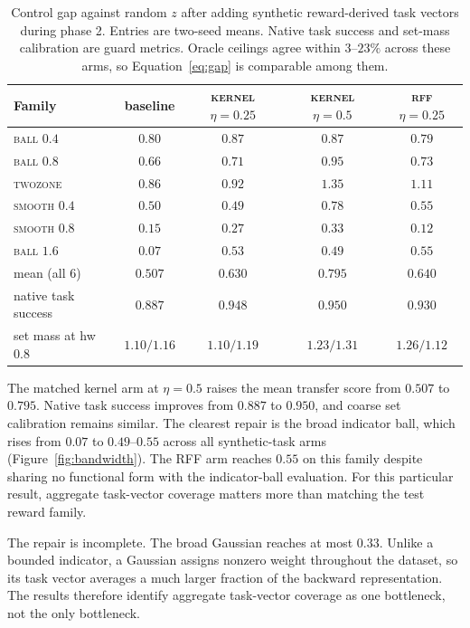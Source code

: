 \documentclass{article}
\begin{document}
\begin{table}[t]
\centering\small
\begin{tabular}{l c c c c}
\toprule
Family & baseline & \textsc{kernel} $\eta{=}0.25$ & \textsc{kernel} $\eta{=}0.5$ & \textsc{rff} $\eta{=}0.25$ \\
\midrule
\textsc{ball} $0.4$   & $0.80$ & $0.87$ & $0.87$ & $0.79$ \\
\textsc{ball} $0.8$   & $0.66$ & $0.71$ & $\mathbf{0.95}$ & $0.73$ \\
\textsc{twozone}      & $0.86$ & $0.92$ & $\mathbf{1.35}$ & $1.11$ \\
\textsc{smooth} $0.4$ & $0.50$ & $0.49$ & $\mathbf{0.78}$ & $0.55$ \\
\textsc{smooth} $0.8$ & $0.15$ & $0.27$ & $0.33$ & $0.12$ \\
\textsc{ball} $1.6$   & $0.07$ & $\mathbf{0.53}$ & $\mathbf{0.49}$ & $\mathbf{0.55}$ \\
\midrule
mean (all 6)          & $0.507$ & $0.630$ & $\mathbf{0.795}$ & $0.640$ \\
native task success  & $0.887$ & $0.948$ & $0.950$ & $0.930$ \\
set mass at hw $0.8$ & $1.10/1.16$ & $1.10/1.19$ & $1.23/1.31$ & $1.26/1.12$ \\
\bottomrule
\end{tabular}
\caption{Control gap against random $z$ after adding synthetic reward-derived
task vectors during phase 2. Entries are two-seed means. Native task success and
set-mass calibration are guard metrics. Oracle ceilings agree within $3$--$23\%$
across these arms, so Equation~\ref{eq:gap} is comparable among them.}
\label{tab:rewardz}
\end{table}

The matched kernel arm at $\eta=0.5$ raises the mean transfer score from $0.507$
to $0.795$. Native task success improves from $0.887$ to $0.950$, and coarse set
calibration remains similar. The clearest repair is the broad indicator ball,
which rises from $0.07$ to $0.49$--$0.55$ across all synthetic-task arms
(Figure~\ref{fig:bandwidth}). The RFF arm reaches $0.55$ on this family despite
sharing no functional form with the indicator-ball evaluation. For this particular
result, aggregate task-vector coverage matters more than matching the test reward
family.

The repair is incomplete. The broad Gaussian reaches at most $0.33$. Unlike a
bounded indicator, a Gaussian assigns nonzero weight throughout the dataset, so
its task vector averages a much larger fraction of the backward representation.
The results therefore identify aggregate task-vector coverage as one bottleneck,
not the only bottleneck.
\end{document}
